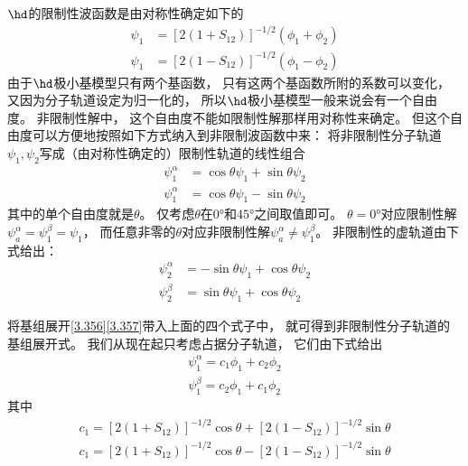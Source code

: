 $\hd$的限制性波函数是由对称性确定如下的
\begin{align}
	\psi_1 &= [2(1+S_{12} )]^{-1/2}(\phi_1+\phi_2)
	\label{3.356}
	\\
	\psi_1 &= [2(1-S_{12})]^{-1/2}(\phi_1-\phi_2)
	\label{3.357}
\end{align}
由于$\hd$极小基模型只有两个基函数，
只有这两个基函数所附的系数可以变化，
又因为分子轨道设定为归一化的，
所以$\hd$极小基模型一般来说会有一个自由度。
非限制性解中，
这个自由度不能如限制性解那样用对称性来确定。
但这个自由度可以方便地按照如下方式纳入到非限制波函数中来：
将非限制性分子轨道$\psi_1,\psi_2$写成（由对称性确定的）限制性轨道的线性组合
\begin{align}
	\psi_1^\alpha &= \cos\theta \psi_1 + \sin\theta \psi_2 \\
	\psi_1^\alpha &= \cos\theta \psi_1 - \sin\theta \psi_2 
\end{align}
其中的单个自由度就是$\theta$。 
仅考虑$\theta$在$0\text{°}$和$45\text{°}$之间取值即可。
$\theta=0\text{°}$对应限制性解$\psi_a^\alpha=\psi_1^\beta=\psi_1$，
而任意非零的$\theta$对应非限制性解$\psi_a^\alpha \neq \psi_1^\beta$。
非限制性的虚轨道由下式给出：
\begin{align}
	\psi_2^\alpha &= - \sin\theta \psi_1 + \cos\theta \psi_2 \label{3.358}\\
	\psi_2^\beta &=  \sin\theta \psi_1 + \cos\theta \psi_2 \label{3.359}
\end{align}

将基组展开\autoref{3.356}\autoref{3.357}带入上面的四个式子中，
就可得到非限制性分子轨道的基组展开式。
我们从现在起只考虑占据分子轨道，
它们由下式给出
\begin{align}
	\psi_1^\alpha = c_1\phi_1 + c_2\phi_2 \label{3.362}\\
	\psi_1^\beta = c_2\phi_1 + c_1\phi_2 \label{3.363}
\end{align}
其中
\begin{align}
	c_1 = [2(1+S_{12} )]^{-1/2}\cos\theta + [2(1 - S_{12} )]^{-1/2}\sin\theta\\
	c_1 = [2(1+S_{12} )]^{-1/2}\cos\theta - [2(1 - S_{12} )]^{-1/2}\sin\theta
\end{align}


